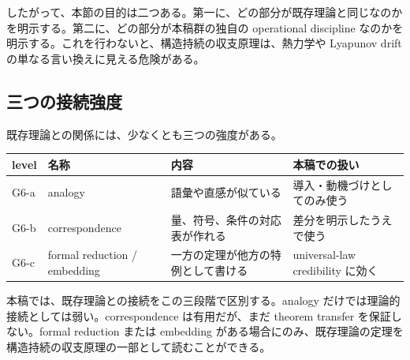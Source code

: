 \documentclass[12pt,a4paper]{article}
\begin{document}
したがって、本節の目的は二つある。第一に、どの部分が既存理論と同じなのかを明示する。第二に、どの部分が本稿群の独自の operational discipline なのかを明示する。これを行わないと、構造持続の収支原理は、熱力学や Lyapunov drift の単なる言い換えに見える危険がある。

\subsection{三つの接続強度}\label{ux4e09ux3064ux306eux63a5ux7d9aux5f37ux5ea6}

既存理論との関係には、少なくとも三つの強度がある。

{\def\LTcaptype{table} %
\begin{longtable}[]{@{}
  >{\raggedright\arraybackslash}p{}
  >{\raggedright\arraybackslash}p{}
  >{\raggedright\arraybackslash}p{}
  >{\raggedright\arraybackslash}p{}@{}}
\toprule\noalign{}
\begin{minipage}[b]{\linewidth}\raggedright
level
\end{minipage} & \begin{minipage}[b]{\linewidth}\raggedright
名称
\end{minipage} & \begin{minipage}[b]{\linewidth}\raggedright
内容
\end{minipage} & \begin{minipage}[b]{\linewidth}\raggedright
本稿での扱い
\end{minipage} \\
\midrule\noalign{}
\endhead
\bottomrule\noalign{}
\endlastfoot
G6-a & analogy & 語彙や直感が似ている & 導入・動機づけとしてのみ使う \\
G6-b & correspondence & 量、符号、条件の対応表が作れる & 差分を明示したうえで使う \\
G6-c & formal reduction / embedding & 一方の定理が他方の特例として書ける & universal-law credibility に効く \\
\end{longtable}
}

本稿では、既存理論との接続をこの三段階で区別する。analogy だけでは理論的接続としては弱い。correspondence は有用だが、まだ theorem transfer を保証しない。formal reduction または embedding がある場合にのみ、既存理論の定理を構造持続の収支原理の一部として読むことができる。
\end{document}
